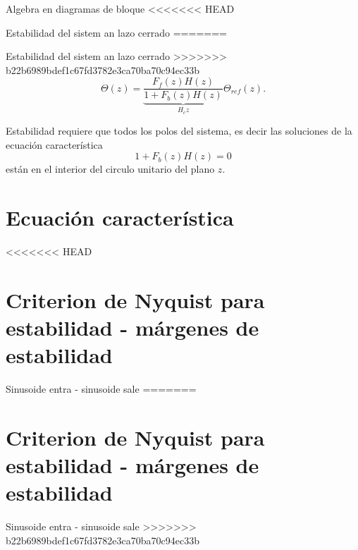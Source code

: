 \documentclass[presentation,aspectratio=169]{beamer}
\begin{document}
\begin{frame}[label={sec:org8e8e439}]{Algebra en diagramas de bloque}
<<<<<<< HEAD
\begin{frame}[label={sec:org5218f19}]{Estabilidad del sistem an lazo cerrado}
=======
\begin{frame}[label={sec:org6c6bd80}]{Estabilidad del sistem an lazo cerrado}
>>>>>>> b22b6989bdef1c67fd3782e3ca70ba70c94ec33b
\[ \Theta(z) = \underbrace{\frac{F_f(z)H(z)}{1 + F_b(z)H(z)}}_{H_c{z}} \Theta_{ref}(z). \]

\begin{tcolorbox}
Estabilidad requiere que todos los polos del sistema, es decir las soluciones de la ecuación característica
\[ 1 + F_b(z)H(z) = 0\]
están en el interior del circulo unitario  del plano $z$.
\end{tcolorbox}
\end{frame}

\section{Ecuación característica}
<<<<<<< HEAD
\label{sec:org477f214}

\section{Criterion de Nyquist para estabilidad - márgenes de estabilidad}
\label{sec:org96d972a}

\begin{frame}[label={sec:org4ce2307}]{Sinusoide entra - sinusoide sale}
=======
\label{sec:org9618a6e}

\section{Criterion de Nyquist para estabilidad - márgenes de estabilidad}
\label{sec:org2400118}

\begin{frame}[label={sec:org4ef220b}]{Sinusoide entra - sinusoide sale}
>>>>>>> b22b6989bdef1c67fd3782e3ca70ba70c94ec33b
\begin{center}
\end{center}
\end{frame}
\end{frame}
\end{frame}
\end{frame}
\end{document}
